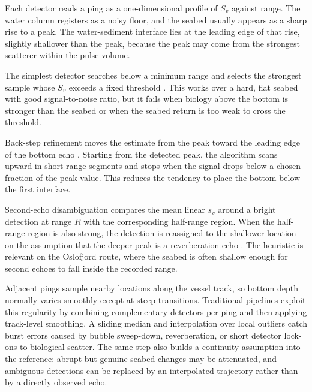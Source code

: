 Each detector reads a ping as a one-dimensional profile of $S_v$ against range. The water column registers as a noisy floor, and the seabed usually appears as a sharp rise to a peak. The water-sediment interface lies at the leading edge of that rise, slightly shallower than the peak, because the peak may come from the strongest scatterer within the pulse volume.

The simplest detector searches below a minimum range and selects the strongest sample whose $S_v$ exceeds a fixed threshold \cite{bourguignon_methodological_2009}. This works over a hard, flat seabed with good signal-to-noise ratio, but it fails when biology above the bottom is stronger than the seabed or when the seabed return is too weak to cross the threshold.

Back-step refinement moves the estimate from the peak toward the leading edge of the bottom echo \cite{crimac_classifiers_bottom}. Starting from the detected peak, the algorithm scans upward in short range segments and stops when the signal drops below a chosen fraction of the peak value. This reduces the tendency to place the bottom below the first interface.

Second-echo disambiguation compares the mean linear $s_v$ around a bright detection at range $R$ with the corresponding half-range region. When the half-range region is also strong, the detection is reassigned to the shallower location on the assumption that the deeper peak is a reverberation echo \cite{crimac_classifiers_bottom}. The heuristic is relevant on the Oslofjord route, where the seabed is often shallow enough for second echoes to fall inside the recorded range.

Adjacent pings sample nearby locations along the vessel track, so bottom depth normally varies smoothly except at steep transitions. Traditional pipelines exploit this regularity by combining complementary detectors per ping and then applying track-level smoothing. A sliding median and interpolation over local outliers catch burst errors caused by bubble sweep-down, reverberation, or short detector lock-ons to biological scatter. The same step also builds a continuity assumption into the reference: abrupt but genuine seabed changes may be attenuated, and ambiguous detections can be replaced by an interpolated trajectory rather than by a directly observed echo.
